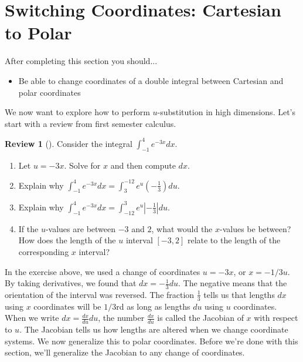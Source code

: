 \documentclass[10pt,]{book}
\theoremstyle{plain}
\theoremstyle{definition}
\theoremstyle{definition}
\theoremstyle{definition}
\newtheorem{project}{Review}[section]
\theoremstyle{definition}
\theoremstyle{definition}
\numberwithin{equation}{section}
\newcommand{\ds}{\displaystyle}
\begin{document}
\section[{Switching Coordinates: Cartesian to Polar}]{Switching Coordinates: Cartesian to Polar}\label{section-40}
After completing this section you should... \leavevmode%
\begin{itemize}[label=\textbullet]
\item{}Be able to change coordinates of a double integral between Cartesian and polar coordinates%
\end{itemize}
%
\par
We now want to explore how to perform \(u\)-substitution in high dimensions. Let's start with a review from first semester calculus.%
\begin{project}[]\label{project-25}
Consider the integral \(\ds\int_{-1}^4 e^{-3x} dx\). \leavevmode%
\begin{enumerate}
\item\hypertarget{li-200}{}Let \(u=-3x\).  Solve for \(x\) and then compute \(dx\).%
\item\hypertarget{li-201}{}Explain why \(\ds\int_{-1}^4 e^{-3x} dx=\int_{3}^{-12}e^u \left(-\frac{1}{3}\right)du\).%
\item\hypertarget{li-202}{}Explain why \(\ds\int_{-1}^4 e^{-3x} dx=\int_{-12}^{3}e^u \left|-\frac{1}{3}\right| du\).%
\item\hypertarget{li-203}{}If the \(u\)-values are between \(-3\) and \(2\), what would the \(x\)-values be between? How does the  length of the \(u\) interval \([-3,2]\) relate to the length of the corresponding \(x\) interval?%
\end{enumerate}
%
\end{project}
In the exercise above, we used a change of coordinates \(u=-3x\), or \(x=-1/3 u\). By taking derivatives, we found that \(dx=-\frac{1}{3}du\). The negative means that the orientation of the interval was reversed. The fraction \(\frac13\) tells us that lengths \(dx\) using \(x\) coordinates will be \(1/3\)rd as long as lengths \(du\) using \(u\) coordinates. When we write \(dx = \frac{dx}{du}du\), the number \(\frac{dx}{du}\) is called the Jacobian of \(x\) with respect to \(u\). The Jacobian tells us how lengths are altered when we change coordinate systems. We now generalize this to polar coordinates. Before we're done with this section, we'll generalize the Jacobian to any change of coordinates.%
\end{document}
